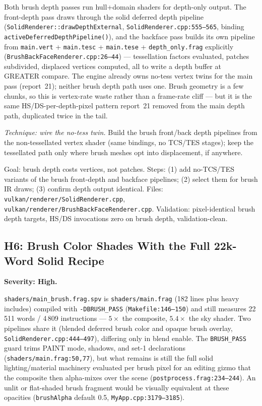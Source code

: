 \documentclass[11pt,a4paper]{article}
\begin{document}
Both brush depth passes run hull+domain shaders for depth-only output. The
front-depth pass draws through the solid deferred depth pipeline
(\texttt{SolidRenderer::drawDepthExternal},
\texttt{SolidRenderer.cpp:555--565}, binding
\texttt{activeDeferredDepthPipeline()}), and the backface pass builds its
own pipeline from \texttt{main.vert} + \texttt{main.tesc} +
\texttt{main.tese} + \texttt{depth\_only.frag} explicitly
(\texttt{BrushBackFaceRenderer.cpp:26--44}) --- tessellation factors
evaluated, patches subdivided, displaced vertices computed, all to write a
depth buffer at GREATER compare. The engine already owns no-tess vertex
twins for the main pass (report~21); neither brush depth path uses one.
Brush geometry is a few chunks, so this is vertex-rate waste rather than a
frame-rate cliff --- but it is the same HS/DS-per-depth-pixel pattern
report~21 removed from the main depth path, duplicated twice in the tail.

\textit{Technique: wire the no-tess twin.} Build the brush front/back depth
pipelines from the non-tessellated vertex shader (same bindings, no TCS/TES
stages); keep the tessellated path only where brush meshes opt into
displacement, if anywhere.

\begin{tcolorbox}[promptbox={Prompt --- H5: de-tessellated brush depth}]
Goal: brush depth costs vertices, not patches. Steps: (1) add no-TCS/TES
variants of the brush front-depth and backface pipelines; (2) select them
for brush IR draws; (3) confirm depth output identical. Files:
\texttt{vulkan/renderer/SolidRenderer.cpp},
\texttt{vulkan/renderer/BrushBackFaceRenderer.cpp}. Validation:
pixel-identical brush depth targets, HS/DS invocations zero on brush depth,
validation-clean.
\end{tcolorbox}

\subsection{H6: Brush Color Shades With the Full 22k-Word Solid Recipe}
\label{sec:h6}

\textbf{Severity: High.}

\texttt{shaders/main\_brush.frag.spv} is \texttt{shaders/main.frag} (182
lines plus heavy includes) compiled with \texttt{-DBRUSH\_PASS}
(\texttt{Makefile:146--150}) and still measures 22\,511 words / 4\,809
instructions --- $5\times$ the composite, $5.4\times$ the sky shader. Two
pipelines share it (blended deferred brush color and opaque brush overlay,
\texttt{SolidRenderer.cpp:444--497}), differing only in blend enable. The
\texttt{BRUSH\_PASS} guard trims PAINT mode, shadows, and set-1 declarations
(\texttt{shaders/main.frag:50,77}), but what remains is still the full solid
lighting/material machinery evaluated per brush pixel for an editing
gizmo that the composite then alpha-mixes over the scene
(\texttt{postprocess.frag:234--244}). An unlit or flat-shaded brush
fragment would be visually equivalent at these opacities
(\texttt{brushAlpha} default 0.5, \texttt{MyApp.cpp:3179--3185}).
\end{document}
